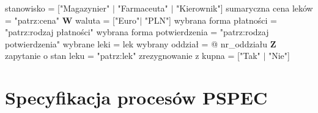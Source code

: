 \documentclass[a4paper, 11pt]{article}
\begin{document}
	\noindent
	stanowisko = ["Magazynier" $|$ "Farmaceuta" $|$ "Kierownik"] \newline
	sumaryczna cena leków = "patrz:cena" \newline \newline
	\textbf{W} \newline \newline
	\noindent
	waluta = ["{E}uro"$|$ "PLN"] \newline
	wybrana forma płatności = "patrz:rodzaj płatności" \newline
	wybrana forma potwierdzenia = "patrz:rodzaj potwierdzenia" \newline
	wybrane leki = {lek} \newline
	wybrany oddział = @ nr\_oddziału \newline \newline
	\textbf{Z} \newline \newline
	\noindent	
	zapytanie o stan leku = "patrz:lek" \newline
	zrezygnowanie z kupna = ["Tak" $|$ "Nie"] \newline \newline
	
	\section{Specyfikacja procesów PSPEC}
\end{document}
